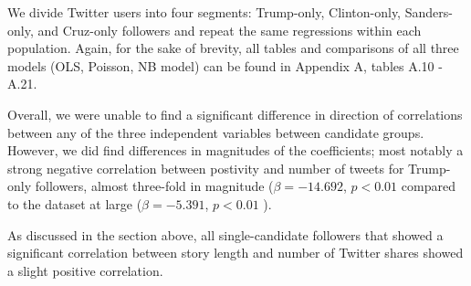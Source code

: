 We divide Twitter users into four segments: Trump-only, Clinton-only, Sanders-only, and Cruz-only followers and repeat the same regressions within each population. Again, for the sake of brevity, all tables and comparisons of all three models (OLS, Poisson, NB model) can be found in Appendix A, tables A.10 - A.21.

Overall, we were unable to find a significant difference in direction of correlations between any of the three independent variables between candidate groups. However, we did find differences in magnitudes of the coefficients; most notably a strong negative correlation between postivity and number of tweets for Trump-only followers, almost three-fold in magnitude ($\beta=-14.692$, $p<0.01$ compared to the dataset at large ($\beta=-5.391$, $p<0.01$ ).

As discussed in the section above, all single-candidate followers that showed a significant correlation between story length and number of Twitter shares showed a slight positive correlation.













